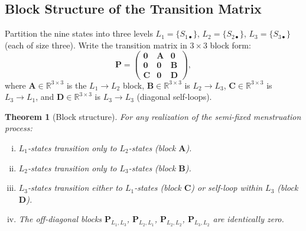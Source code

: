 \documentclass[12pt,a4paper]{article}
\newtheorem{theorem}{Theorem}
\newcommand{\mat}[1]{\mathbf{#1}}
\begin{document}
\subsection{Block Structure of the Transition Matrix}
\label{sec:block}

Partition the nine states into three levels $L_1 = \{S_{1\bullet}\}$,
$L_2 = \{S_{2\bullet}\}$, $L_3 = \{S_{3\bullet}\}$ (each of size three).
Write the transition matrix in $3 \times 3$ block form:
\begin{equation}\label{eq:block}
  \mat{P} =
  \begin{pmatrix}
    \mat{0} & \mat{A} & \mat{0} \\
    \mat{0} & \mat{0} & \mat{B} \\
    \mat{C} & \mat{0} & \mat{D}
  \end{pmatrix},
\end{equation}
where $\mat{A} \in \mathbb{R}^{3\times3}$ is the $L_1 \to L_2$ block,
$\mat{B} \in \mathbb{R}^{3\times3}$ is $L_2 \to L_3$,
$\mat{C} \in \mathbb{R}^{3\times3}$ is $L_3 \to L_1$, and
$\mat{D} \in \mathbb{R}^{3\times3}$ is $L_3 \to L_3$ (diagonal self-loops).

\begin{theorem}[Block structure]\label{thm:block}
For any realization of the semi-fixed menstruation process:
\begin{enumerate}[(i)]
  \item $L_1$-states transition only to $L_2$-states (block $\mat{A}$).
  \item $L_2$-states transition only to $L_3$-states (block $\mat{B}$).
  \item $L_3$-states transition either to $L_1$-states (block $\mat{C}$)
        or self-loop within $L_3$ (block $\mat{D}$).
  \item The off-diagonal blocks $\mat{P}_{L_1,L_3}$,
        $\mat{P}_{L_2,L_1}$, $\mat{P}_{L_2,L_2}$, $\mat{P}_{L_3,L_2}$
        are identically zero.
\end{enumerate}
\end{theorem}
\end{document}

